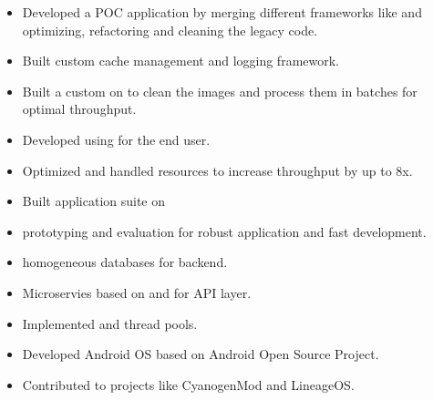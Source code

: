 \documentclass[10pt,a4paper,ragged2e, normalphoto]{altacv}
\begin{document}
\begin{itemize}
  \item Developed a POC application by merging different frameworks like and optimizing, refactoring and cleaning the legacy code.
  \item Built custom cache management and logging framework.
 \end{itemize}
\vspace{10pt}
\begin{itemize}
  \item Built a custom on to clean the images and process them in batches for optimal throughput.
  \item Developed using for the end user.
  \item Optimized and handled resources to increase throughput by up to 8x.
 \end{itemize}
 



\begin{itemize}
  \item Built application suite on 
  \item {}prototyping and evaluation for robust application and fast development.
  \item {}homogeneous databases for backend.
  \item Microservies based on and for API layer.
  \item Implemented and thread pools.
 \end{itemize}

\begin{itemize}
  \item Developed Android OS based on Android Open Source Project.
  \item Contributed to projects like CyanogenMod and LineageOS.
 \end{itemize}
\end{document}
